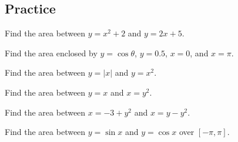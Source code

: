 \subsection{Practice}

\begin{exercise}

Find the area between \(y=x^2+2\) and \(y=2x+5\).

\end{exercise}
\vspace*{6\baselineskip}


\begin{exercise}

Find the area enclosed by \(y=\cos\theta\), \(y=0.5\), \(x=0\), and
\(x=\pi\).

\end{exercise}
\vspace*{6\baselineskip}


\begin{exercise}

Find the area between \(y=|x|\) and \(y=x^2\).

\end{exercise}
\vspace*{6\baselineskip}

\begin{exercise}

Find the area between \(y=x\) and \(x=y^2\).

\end{exercise}
\vspace*{6\baselineskip}

\begin{exercise}

Find the area between \(x= - 3+y^2\) and \(x=y - y^2\).

\end{exercise}
\vspace*{6\baselineskip}

\begin{exercise}

Find the area between \(y=\sin x\) and \(y=\cos x\) over \([ - \pi,\pi]\).

\end{exercise}


